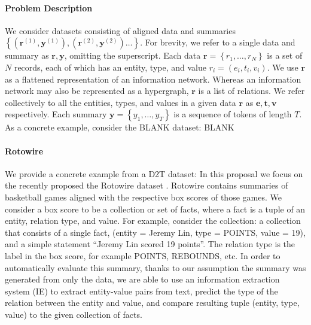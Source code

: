 \documentclass[11pt]{article}
\newcommand\set[1]{\left\{#1\right\}}
\newcommand{\be}{\mathbf{e}}
\newcommand{\br}{\mathbf{r}}
\newcommand{\bt}{\mathbf{t}}
\newcommand{\bv}{\mathbf{v}}
\newcommand{\by}{\mathbf{y}}
\begin{document}

\paragraph{Problem Description}
We consider datasets consisting of aligned data and summaries
$\set{(\br^{(1)}, \by^{(1)}),(\br^{(2)},\by^{(2)})\ldots}$.
For brevity, we refer to a single data and summary as $\br,\by$, omitting the superscript.
Each data $\br = \set{r_1,\ldots,r_N}$ is a set of $N$ records, each of which has
an entity, type, and value $r_i = (e_i, t_i, v_i)$.
We use $\br$ as a flattened representation of an information network.
Whereas an information network may also be represented as a hypergraph,
$\br$ is a list of relations.
We refer collectively to all the entities, types, and values in a given data $\br$ as
$\be,\bt,\bv$ respectively.
Each summary $\by = \set{y_1,\ldots,y_T}$ is a sequence of tokens of length $T$.
As a concrete example, consider the BLANK dataset:
BLANK

\paragraph{Rotowire}
\begin{comment}
\item Motivating extraction example
\item Transition towards more formal definitions so that we can define the tasks
\item TODO: Can maybe replace this whole section with a picture.
\end{comment}

We provide a concrete example from a D2T dataset:
In this proposal we focus on the recently proposed
the Rotowire dataset \citep{wiseman2017d2t}.
Rotowire contains summaries of basketball games aligned with the respective
box scores of those games.
We consider a box score to be a collection or set of facts,
where a fact is a tuple of an entity, relation type, and value.
For example, consider the collection:
a collection that consists of a single fact, (entity = Jeremy Lin, type = POINTS, value = 19),
and a simple statement ``Jeremy Lin scored 19 points''.
The relation type is the label in the box score, for example POINTS, REBOUNDS, etc.
In order to automatically evaluate this summary,
thanks to our assumption the summary was generated from only the data,
we are able to use an information extraction system (IE) to extract entity-value pairs
from text,
predict the type of the relation between the entity and value,
and compare resulting tuple (entity, type, value) to the given collection of facts.
\end{document}
